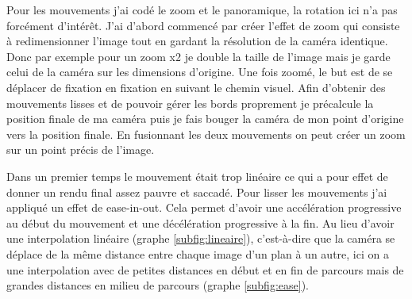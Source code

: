 \par
Pour les mouvements j'ai codé le zoom et le panoramique, la rotation ici n'a pas forcément d'intérêt. J'ai d'abord commencé par créer l'effet de zoom qui consiste à redimensionner l'image tout en gardant la résolution de la caméra identique. Donc par exemple pour un zoom x2 je double la taille de l'image mais je garde celui de la caméra sur les dimensions d'origine. Une fois zoomé, le but est de se déplacer de fixation en fixation en suivant le chemin visuel. Afin d'obtenir des mouvements lisses et de pouvoir gérer les bords proprement je précalcule la position finale de ma caméra puis je fais bouger la caméra de mon point d'origine vers la position finale. En fusionnant les deux mouvements on peut créer un zoom sur un point précis de l'image.

\par
Dans un premier temps le mouvement était trop linéaire ce qui a pour effet de donner un rendu final assez pauvre et saccadé. Pour lisser les mouvements j'ai appliqué un effet de ease-in-out. Cela permet d'avoir une accélération progressive au début du mouvement et une décélération progressive à la fin. Au lieu d'avoir une interpolation linéaire (graphe \ref{subfig:lineaire}), c'est-à-dire que la caméra se déplace de la même distance entre chaque image d'un plan à un autre, ici on a une interpolation avec de petites distances en début et en fin de parcours mais de grandes distances en milieu de parcours (graphe \ref{subfig:ease}).

